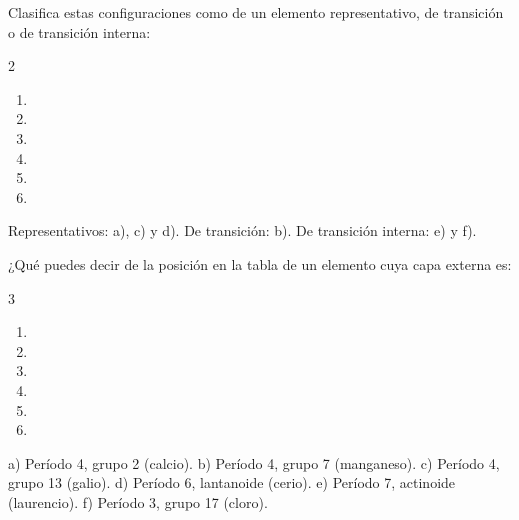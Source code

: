 \begin{exercise}
    Clasifica estas configuraciones como de un elemento representativo, de transición o de transición interna:
    \begin{multicols}{2}
        \begin{enumerate}[label=\alph*)]
            \item {}
            \item {}
            \item {}
            \item {}
            \item {}
            \item {}
        \end{enumerate}
    \end{multicols}
    \begin{solu}
        Representativos: a), c) y d). De transición: b). De transición interna: e) y f).
    \end{solu}
\end{exercise}

\begin{exercise}
    ¿Qué puedes decir de la posición en la tabla de un elemento cuya capa externa es:
    \begin{multicols}{3}
        \begin{enumerate}[label=\alph*)]
            \item {}
            \item {}
            \item {}
            \item {}
            \item {}
            \item {}
        \end{enumerate}
    \end{multicols}
    \begin{solu}
        a) Período 4, grupo 2 (calcio). b) Período 4, grupo 7 (manganeso). c) Período 4, grupo 13 (galio). d) Período 6, lantanoide (cerio). e) Período 7, actinoide (laurencio). f) Período 3, grupo 17 (cloro).
    \end{solu}
\end{exercise}

